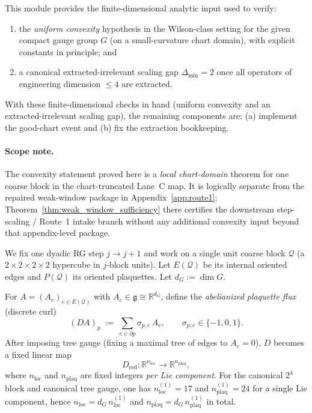 This module provides the finite-dimensional analytic input used to verify:
\begin{enumerate}[label=(G\arabic*)]
\item the \emph{uniform convexity} hypothesis in the Wilson-class setting for the given compact gauge group $G$ (on a small-curvature chart domain), with explicit constants in principle; and
\item a canonical extracted-irrelevant scaling gap $\Delta_{\min}=2$ once all operators of engineering dimension $\le 4$ are extracted.
\end{enumerate}
With these finite-dimensional checks in hand (uniform convexity and an extracted-irrelevant scaling gap), the remaining components are:
(a) implement the good-chart event and (b) fix the extraction bookkeeping.

\paragraph{Scope note.}
The convexity statement proved here is a \emph{local chart-domain} theorem for one coarse block in the chart-truncated Lane~C map.
It is logically separate from the repaired weak-window package in Appendix~\ref{app:route1}; Theorem~\ref{thm:weak_window_sufficiency}
there certifies the downstream step-scaling / Route~1 intake branch without any additional convexity input beyond that appendix-level package.

We fix one dyadic RG step $j\to j+1$ and work on a single unit coarse block $\mathcal Q$ (a $2\times 2\times 2\times 2$ hypercube in $j$-block units).
Let $E(\mathcal Q)$ be its internal oriented edges and $P(\mathcal Q)$ its oriented plaquettes.
Let $d_G:=\dim G$.

For $A=(A_e)_{e\in E(\mathcal Q)}$ with $A_e\in\mathfrak g\cong\mathbb R^{d_G}$, define the \emph{abelianized plaquette flux} (discrete curl)
\[
(D A)_p\ :=\ \sum_{e\in\partial p} \sigma_{p,e}\,A_e,
\qquad \sigma_{p,e}\in\{-1,0,1\}.
\]
After imposing tree gauge (fixing a maximal tree of edges to $A_e=0$), $D$ becomes a fixed linear map
\[
D_{\mathrm{red}}:\mathbb R^{n_{\mathrm{loc}}}\to \mathbb R^{n_{\mathrm{plaq}}},
\]
where $n_{\mathrm{loc}}$ and $n_{\mathrm{plaq}}$ are fixed integers \emph{per Lie component}.
For the canonical $2^4$ block and canonical tree gauge, one has $n_{\mathrm{loc}}^{(1)}=17$ and $n_{\mathrm{plaq}}^{(1)}=24$ for a single Lie component,
hence $n_{\mathrm{loc}}=d_G\,n_{\mathrm{loc}}^{(1)}$ and $n_{\mathrm{plaq}}=d_G\,n_{\mathrm{plaq}}^{(1)}$ in total.

